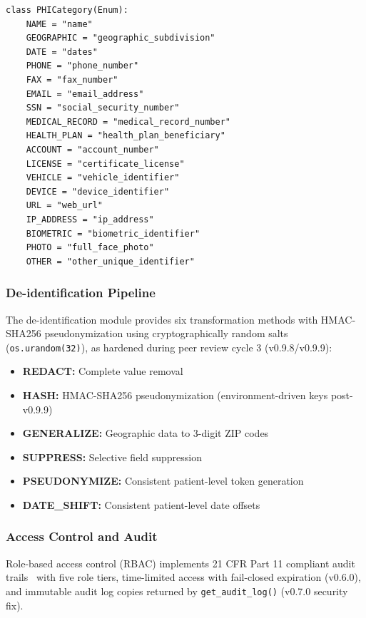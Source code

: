 \documentclass[10pt]{article}
\begin{document}
\begin{lstlisting}[caption={PHI detection categories from \texttt{privacy/phi-pii-management/phi\_detector.py} (v0.6.0)}]
class PHICategory(Enum):
    NAME = "name"
    GEOGRAPHIC = "geographic_subdivision"
    DATE = "dates"
    PHONE = "phone_number"
    FAX = "fax_number"
    EMAIL = "email_address"
    SSN = "social_security_number"
    MEDICAL_RECORD = "medical_record_number"
    HEALTH_PLAN = "health_plan_beneficiary"
    ACCOUNT = "account_number"
    LICENSE = "certificate_license"
    VEHICLE = "vehicle_identifier"
    DEVICE = "device_identifier"
    URL = "web_url"
    IP_ADDRESS = "ip_address"
    BIOMETRIC = "biometric_identifier"
    PHOTO = "full_face_photo"
    OTHER = "other_unique_identifier"
\end{lstlisting}

\subsubsection{De-identification Pipeline}

The de-identification module provides six transformation methods with HMAC-SHA256 pseudonymization using cryptographically random salts (\texttt{os.urandom(32)}), as hardened during peer review cycle 3 (v0.9.8/v0.9.9):

\begin{itemize}
  \item \textbf{REDACT:} Complete value removal
  \item \textbf{HASH:} HMAC-SHA256 pseudonymization (environment-driven keys post-v0.9.9)
  \item \textbf{GENERALIZE:} Geographic data to 3-digit ZIP codes
  \item \textbf{SUPPRESS:} Selective field suppression
  \item \textbf{PSEUDONYMIZE:} Consistent patient-level token generation
  \item \textbf{DATE\_SHIFT:} Consistent patient-level date offsets
\end{itemize}

\subsubsection{Access Control and Audit}

Role-based access control (RBAC) implements 21 CFR Part 11 compliant audit trails~\cite{cfr_part11} with five role tiers, time-limited access with fail-closed expiration (v0.6.0), and immutable audit log copies returned by \texttt{get\_audit\_log()} (v0.7.0 security fix).
\end{document}
